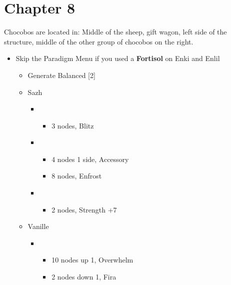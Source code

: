 \chapter{Chapter 8}

	Chocobos are located in: Middle of the sheep, gift wagon, left side of the structure, middle of the other group of chocobos on the right.
	\begin{menu}
		\begin{itemize}
			\item Skip the Paradigm Menu if you used a \textbf{Fortisol} on Enki and Enlil
			      \paradigm
			      \begin{itemize}
			      		\item Generate Balanced [2]
			      \end{itemize}
			      \crystarium
			      \begin{itemize}
				      \item Sazh
				            \begin{itemize}
					            \item \com
					                  \begin{itemize}
						                  \item 3 nodes, Blitz
					                  \end{itemize}
					            \item \syn
					                  \begin{itemize}
						                  \item 4 nodes 1 side, Accessory
						                  \item 8 nodes, Enfrost
					                  \end{itemize}
					            \item \rav
					                  \begin{itemize}
						                  \item 2 nodes, Strength +7
					                  \end{itemize}
				            \end{itemize}
				      \item Vanille
				            \begin{itemize}
					            \item \rav
					                  \begin{itemize}
						                  \item 10 nodes up 1, Overwhelm
						                  \item 2 nodes down 1, Fira

\end{itemize}
\end{itemize}
\end{itemize}
\end{itemize}
\end{menu}
